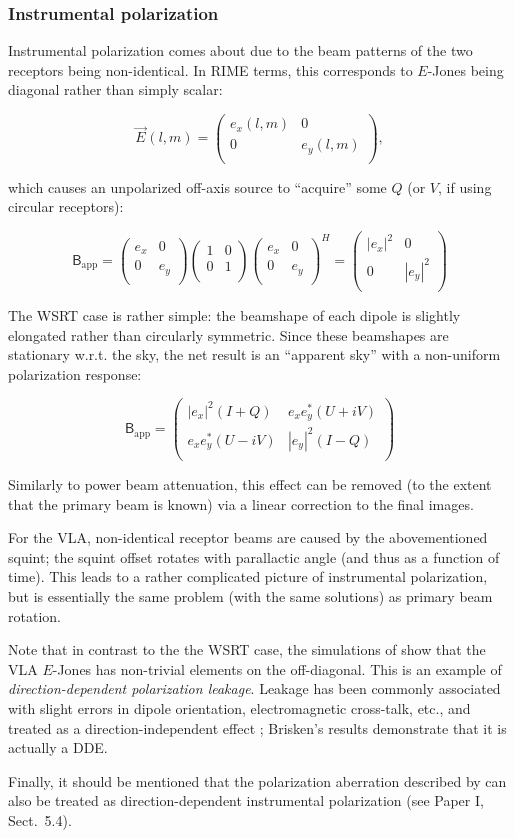 \documentclass[referee]{aa}
\newcommand{\matrixtt}[4]{\left( \begin{array}{cc}#1&#2\\#3&#4\\\end{array} \right)}
\newcommand{\herm}{H}
\newcommand{\jones}[2]{\vec {#1}_{#2}}
\newcommand{\coh}[2]{\mathsf{{#1}}_{{#2}}}
\begin{document}
\subsubsection{Instrumental polarization}

Instrumental polarization comes about due to the beam patterns of the two receptors being non-identical. In RIME terms, this corresponds to $E$-Jones being diagonal rather than simply scalar:

\[
\jones{E}{}(l,m) = \matrixtt{e_x(l,m)}{0}{0}{e_y(l,m)},
\]

which causes an unpolarized off-axis source to ``acquire'' some $Q$ (or $V$, if using circular receptors):

\[
\coh{B}{\mathrm{app}} = \matrixtt{e_x}{0}{0}{e_y} 
\matrixtt{1}{0}{0}{1}
\matrixtt{e_x}{0}{0}{e_y}^\herm =
\matrixtt{|e_x|^2}{0}{0}{|e_y|^2}
\]

The WSRT case is rather simple: the beamshape of each dipole is slightly elongated rather than circularly symmetric. Since these beamshapes are stationary w.r.t. the sky, the net result is an ``apparent sky'' with a non-uniform polarization response: 

\[
\coh{B}{\mathrm{app}} = \matrixtt{|e_x|^2(I+Q)}{e_x e^*_y(U+iV)}{e_x e^*_y(U-iV)}{|e_y|^2(I-Q)}
\]

Similarly to power beam attenuation, this effect can be removed (to the extent that the primary beam is known) via a linear correction to the final images.

For the VLA, non-identical receptor beams are caused by the abovementioned squint; the squint offset rotates with parallactic angle (and thus as a function of time). This leads to a rather complicated picture of instrumental polarization, but is essentially the same problem (with the same solutions) as primary beam rotation.

Note that in contrast to the the WSRT case, the simulations of \citet{Brisken:VLA-beam} show that the VLA $E$-Jones has non-trivial elements on the off-diagonal. This is an example of \emph{direction-dependent polarization leakage}. Leakage has been commonly associated with slight errors in dipole orientation, electromagnetic cross-talk, etc., and treated as a direction-independent effect \citep{ME1,JEN:note185}; Brisken's results demonstrate that it is actually a DDE.

Finally, it should be mentioned that the polarization aberration described by \citet{Carozzi:ME3D} can also be treated as direction-dependent instrumental polarization (see Paper I, Sect.~5.4). 
\end{document}
